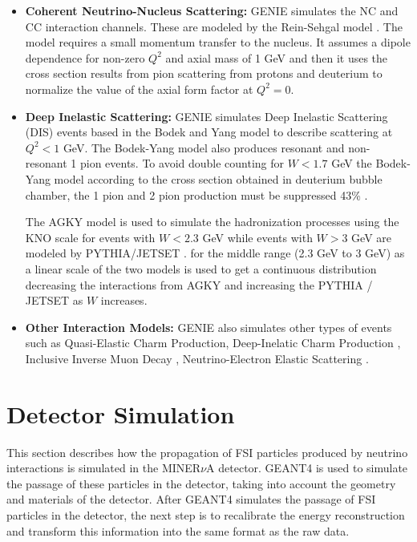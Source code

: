 \begin{itemize}
    \item \textbf{Coherent Neutrino-Nucleus Scattering:} GENIE simulates the NC and CC interaction channels. These are modeled by the Rein-Sehgal model \cite{REINcoh198329}. The model requires a small momentum transfer to the nucleus. It assumes a dipole dependence for non-zero $Q^2$ and axial mass of 1 GeV and then it uses the cross section results from pion scattering from protons and deuterium to normalize the value of the axial form factor at $Q^2=0$. 
    \item \textbf{Deep Inelastic Scattering:} GENIE simulates Deep Inelastic Scattering (DIS) events based in the Bodek and Yang model \cite{Bodek_2003} to describe scattering at $Q^2<1$ GeV. The Bodek-Yang model also produces resonant and non-resonant 1 pion events. To avoid double counting for $W<1.7$ GeV the Bodek-Yang model according to the cross section obtained in deuterium bubble chamber, the 1 pion and 2 pion production must be suppressed 43\% \cite{Rodrigues_2016}. 

    The AGKY model \cite{Yang_2009}is used to simulate the hadronization processes using the KNO scale \cite{KOBA1972317} for events with $W<2.3$ GeV while events with $W>3$ GeV are modeled by PYTHIA/JETSET \cite{PHYTIASJOSTRAND2001238}. for the middle range (2.3 GeV to 3 GeV) as a linear scale of the two models is used to get a continuous distribution decreasing the interactions from AGKY and increasing the PYTHIA / JETSET as $W$ increases. 
    \item \textbf{Other Interaction Models:} GENIE also simulates other types of events such as Quasi-Elastic Charm Production\cite{CharmProd}, Deep-Inelatic Charm Production \cite{PhysRevD.50.3085}, Inclusive Inverse Muon Decay \cite{BARDIN1987839}, Neutrino-Electron Elastic Scattering \cite{William}.
    
\end{itemize}

\section{Detector Simulation}
\label{Cap:Simulation:DetectorSimulation}

This section describes how the propagation of FSI particles produced by neutrino interactions is simulated in the MINER$\nu$A detector. GEANT4 \cite{GEANT4} is used to simulate the passage of these particles in the detector, taking into account the geometry and materials of the detector. After GEANT4 simulates the passage of FSI particles in the detector, the next step is to recalibrate the energy reconstruction and transform this information into the same format as the raw data. 

